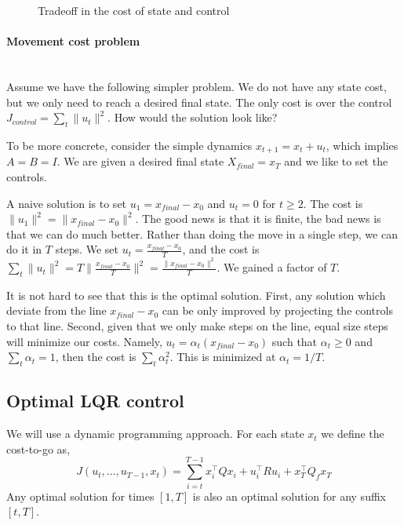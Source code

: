 \begin{figure}
  \begin{centering}
  \caption{Tradeoff in the cost of state and control}\label{fig:L12-cost-tradeoff}
  \end{centering}
\end{figure}


\paragraph{Movement cost problem}\ \\

Assume we have the following simpler problem. We do not have any
state cost, but we only need to reach a desired final state. The
only cost is over the control $J_{control}=\sum_t \|u_t\|^2$. How
would the solution look like?

To be more concrete, consider the simple dynamics $x_{t+1}=x_t+u_t$,
which implies $A=B=I$. We are given a desired final state
$X_{final}=x_T$ and we like to set the controls.

A naive solution is to set $u_1=x_{final}-x_0$ and $u_t=0$ for
$t\geq 2$. The cost is $\|u_1\|^2=\|x_{final}-x_0\|^2$. The good
news is that it is finite, the bad news is that we can do much
better. Rather than doing the move in a single step, we can do it in
$T$ steps. We set $u_t= \frac{x_{final}-x_0}{T}$, and the cost is
$\sum_t \|u_t\|^2=T\|\frac{x_{final}-x_0}{T}\|^2=
\frac{\|x_{final}-x_0\|^2}{T}$. We gained a factor of $T$.

It is not hard to see that this is the optimal solution. First, any
solution which deviate from the line $x_{final}-x_0$ can be only
improved by projecting the controls to that line. Second, given that
we only make steps on the line, equal size steps will minimize our
costs. Namely, $u_t = \alpha_t (x_{final}-x_0)$ such that
$\alpha_t\geq 0$ and $\sum_t\alpha_t=1$, then the cost is $\sum_t
\alpha_t^2$. This is minimized at $\alpha_t=1/T$.

\subsection{Optimal LQR control}

We will use a dynamic programming approach. For each state $x_t$ we
define the cost-to-go as,
\[
J(u_t, \ldots, u_{T-1},x_t)=\sum_{i=t}^{T-1}x_i^\top Qx_i+u_i^\top R
u_i+ x_T^\top Q_f x_T
\]
Any optimal solution for times $[1,T]$ is also an optimal solution
for any suffix $[t,T]$.

